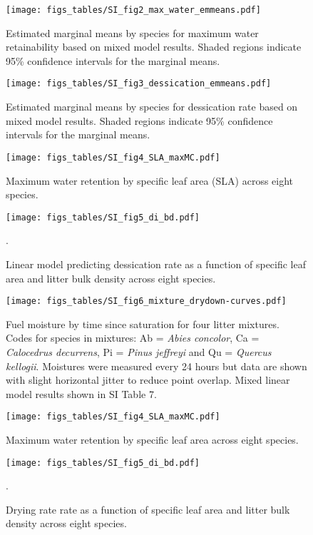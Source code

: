 \documentclass[letterpaper]{article}
\begin{document}
\begin{figure}[H]
  \centering
  \label{SI_fig2}
  \texttt{[image: figs\_tables/SI\_fig2\_max\_water\_emmeans.pdf]}
\caption{Estimated marginal means by species for maximum water retainability based on mixed model results. Shaded regions indicate 95\% confidence intervals for the marginal means.}
\end{figure}


\begin{figure}[H]
  \centering
  \label{SI_fig3}
\texttt{[image: figs\_tables/SI\_fig3\_dessication\_emmeans.pdf]}
\caption{Estimated marginal means by species for dessication rate based on mixed model results. Shaded regions indicate 95\% confidence intervals for the marginal means.}
\end{figure}

\begin{figure}[H]
  \centering
\texttt{[image: figs\_tables/SI\_fig4\_SLA\_maxMC.pdf]}
\caption{Maximum water retention by specific leaf area (SLA) across eight species.}
  \label{fig:maxmc-di}
\end{figure}


\begin{figure}[H]
  \centering
\texttt{[image: figs\_tables/SI\_fig5\_di\_bd.pdf]}
\caption{Linear model predicting dessication rate as a function of specific leaf area and litter bulk density across eight species.}.
  \label{fig:bd-di}
\end{figure}


\begin{figure}[H]
  \centering
\texttt{[image: figs\_tables/SI\_fig6\_mixture\_drydown-curves.pdf]}
\caption{Fuel moisture by time since saturation for four litter mixtures.  Codes for species in mixtures: Ab = \emph{Abies concolor}, Ca = \emph{Calocedrus decurrens}, Pi = \emph{Pinus jeffreyi} and Qu = \emph{Quercus kellogii}. Moistures were measured every 24 hours but data are shown with slight horizontal jitter to reduce point overlap. Mixed linear model results shown in SI Table 7.}
  \label{SI_fig6}
\end{figure}

\begin{figure}[H]
  \centering
\texttt{[image: figs\_tables/SI\_fig4\_SLA\_maxMC.pdf]}
\caption{Maximum water retention by specific leaf area across eight species.
}
  \label{fig:maxmc-di}
\end{figure}

\begin{figure}[H]
  \centering
\texttt{[image: figs\_tables/SI\_fig5\_di\_bd.pdf]}
\caption{Drying rate rate as a function of specific leaf area and litter bulk
  density across eight species.
}.
  \label{fig:bd-di}
\end{figure}
\end{document}
